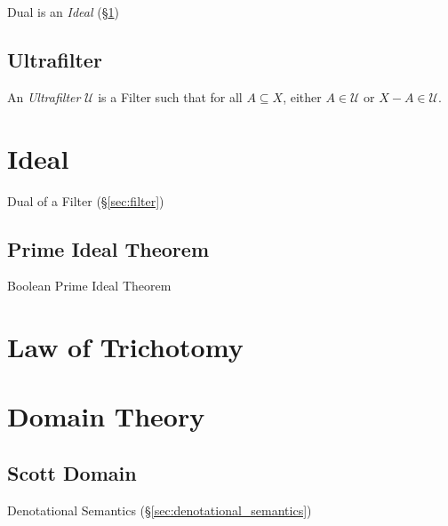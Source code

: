 Dual is an \emph{Ideal} (\S\ref{sec:order_ideal})



\subsection{Ultrafilter}\label{sec:ultrafilter}

An \emph{Ultrafilter} $\mathcal{U}$ is a Filter such that for all $A
\subseteq X$, either $A \in \mathcal{U}$ or $X - A \in \mathcal{U}$.



\section{Ideal}\label{sec:order_ideal}

Dual of a Filter (\S\ref{sec:filter})



\subsection{Prime Ideal Theorem}\label{sec:prime_ideal}

Boolean Prime Ideal Theorem



\section{Law of Trichotomy}\label{sec:trichotomy_law}



\section{Domain Theory}\label{sec:domain_theory}

\subsection{Scott Domain}\label{sec:scott_domain}

Denotational Semantics (\S\ref{sec:denotational_semantics})
